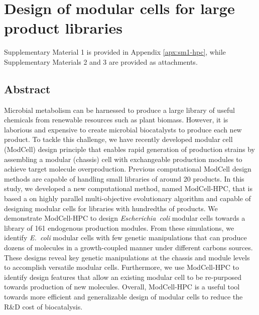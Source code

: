 \chapter{Design of modular cells for large product libraries}
\label{ch:hpc}

Supplementary Material 1 is provided in Appendix \ref{apx:sm1-hpc}, while Supplementary Materials 2 and 3 are provided as attachments.

\section*{Abstract}
    Microbial metabolism can be harnessed to produce a large library of useful chemicals from renewable resources such as plant biomass.
However, it is laborious and expensive to create microbial biocatalysts to produce each new product.
    To tackle this challenge, we have recently developed modular cell (ModCell) design principle that enables rapid generation of production strains by assembling a modular (chassis) cell with exchangeable production modules to achieve target molecule overproduction.
    Previous computational ModCell design methods are capable of handling small libraries of around 20 products.
In this study, we developed a new computational method, named ModCell-HPC, that is based a on highly parallel multi-objective evolutionary algorithm and capable of designing modular cells for libraries with hundredths of products.
    We demonstrate ModCell-HPC to design \textit{Escherichia~coli} modular cells towards a library of 161 endogenous production modules.
    From these simulations, we identify \textit{E.~coli} modular cells with few genetic manipulations that can produce dozens of molecules in a growth-coupled manner under different carbons sources.
    These designs reveal key genetic manipulations at the chassis and module levels to accomplish versatile modular cells.
    Furthermore, we use ModCell-HPC to identify design features that allow an existing modular cell to be re-purposed towards production of new molecules.
    Overall, ModCell-HPC is a useful tool towards more efficient and generalizable design of modular cells to reduce the R\&D cost of biocatalysis.


